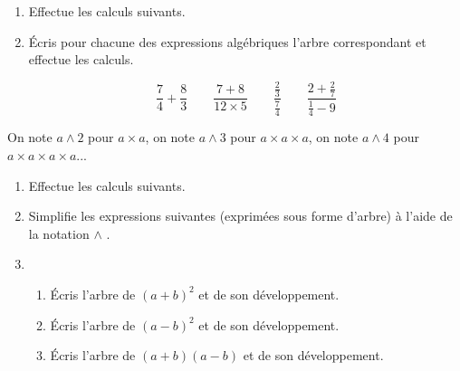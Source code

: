 \documentclass[class=report,crop=false, 12pt]{standalone}
\begin{document}
\begin{activite}
\sauteligne
\begin{enumerate}
  \item Effectue les calculs suivants.

  
  \item Écris pour chacune des expressions algébriques l'arbre correspondant et effectue les calculs.
  
  $$
  \frac 74 + \frac 83
  \qquad
  \frac{7 + 8}{12 \times 5}
  \qquad
  \frac{ \frac 23 }{ \frac 74 }
  \qquad
  \frac{ 2 + \frac 27 }{ \frac 14 - 9 }
  $$

\end{enumerate}
\end{activite}


\begin{activite}

On note $a \wedge 2$ pour $a \times a$, on note $a \wedge 3$ pour $a \times a \times a$, 
on note $a \wedge 4$ pour $a \times a \times a \times a$...

\begin{enumerate}
  \item Effectue les calculs suivants.
  
  
  \item  Simplifie les expressions suivantes (exprimées sous forme d'arbre) à l'aide de la notation \og $\wedge$ \fg{}.


  \item 
  \begin{enumerate}
    \item Écris l'arbre de $(a+b)^2$ et de son développement.
    \item Écris l'arbre de $(a-b)^2$ et de son développement.
    \item Écris l'arbre de $(a+b)(a-b)$ et de son développement.
  \end{enumerate}  
\end{enumerate}
\end{activite}
\end{document}
